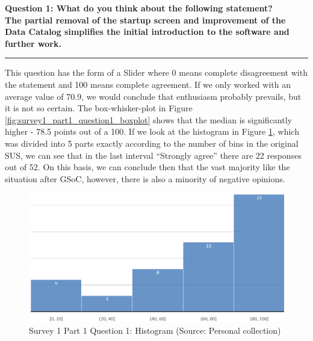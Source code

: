 \documentclass[a4paper,10pt,twoside]{article}
\begin{document}
\newpage
\noindent \textbf{Question 1: What do you think about the following statement? \\
  The partial removal of the startup screen and improvement of the
  Data Catalog simplifies the initial introduction to the software and
  further work.}
\par\noindent\rule{\textwidth}{0.4pt}

\noindent This question has the form of a Slider where 0 means
complete disagreement with the statement and 100 means complete
agreement. If we only worked with an average value of 70.9, we would
conclude that enthusiasm probably prevails, but it is not so
certain. The box-whisker-plot in Figure
\ref{fig:survey1_part1_question1_boxplot} shows that the median is
significantly higher - 78.5 points out of a 100. If we look at the
histogram in Figure \ref{fig:survey1_part1_question1_histogram}, which
was divided into 5 parts exactly according to the number of bins in
the original SUS, we can see that in the last interval ``Strongly
agree'' there are 22 responses out of 52. On this basis, we can
conclude then that the vast majority like the situation after GSoC,
however, there is also a minority of negative opinions.

\begin{figure}[hbt!] 
\begin{center}
\includegraphics[width=12cm]{../surveys/analyzed_data/survey1_part1_question1_excel_histogram.png} 
\caption[Survey 1 Part 1 Question 1: Histogram]{Survey 1 Part 1 Question 1: Histogram (Source: Personal collection)}
\label{fig:survey1_part1_question1_histogram}
\end{center}
\end{figure}
\end{document}
